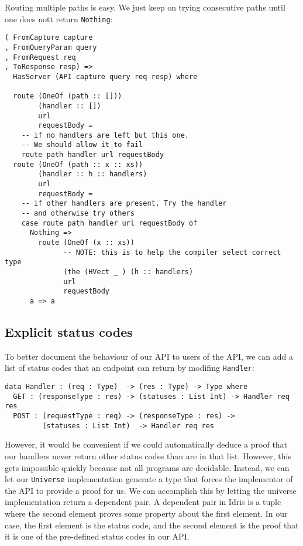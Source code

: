 \documentclass[12pt,a4paper]{article}
\begin{document}
Routing multiple paths is easy. We just keep on trying consecutive paths until one
does nott return \texttt{Nothing}:
\begin{verbatim}
( FromCapture capture
, FromQueryParam query
, FromRequest req
, ToResponse resp) =>
  HasServer (API capture query req resp) where

  route (OneOf (path :: []))
        (handler :: [])
        url
        requestBody =
    -- if no handlers are left but this one.
    -- We should allow it to fail
    route path handler url requestBody
  route (OneOf (path :: x :: xs))
        (handler :: h :: handlers)
        url
        requestBody =
    -- if other handlers are present. Try the handler
    -- and otherwise try others
    case route path handler url requestBody of
      Nothing =>
        route (OneOf (x :: xs))
              -- NOTE: this is to help the compiler select correct type
              (the (HVect _ ) (h :: handlers)
              url
              requestBody
      a => a
\end{verbatim}

\subsection{Explicit status codes}
To better document the behaviour of our API to users of the API, we can add a list of status codes that an endpoint can return by modifing \texttt{Handler}:

\begin{verbatim}
data Handler : (req : Type)  -> (res : Type) -> Type where
  GET : (responseType : res) -> (statuses : List Int) -> Handler req res
  POST : (requestType : req) -> (responseType : res) ->
         (statuses : List Int)  -> Handler req res
\end{verbatim}

However, it would be convenient if we could automatically deduce a proof that our handlers never return
other status codes than are in that list. However, this gets impossible quickly because not all programs are decidable.
Instead, we can let our \texttt{Universe} implementation generate a type that forces the implementor of the API to provide a proof for us. We can accomplish this by letting the universe implementation return a dependent pair. A dependent pair in Idris is a tuple where the second element proves some property about the first element. In our case, the first element is the status code, and the second element is the proof that it is one of the pre-defined status codes in our API.
\end{document}
